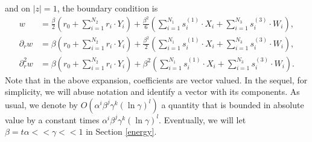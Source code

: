 \documentclass[11pt,letterpaper]{amsart}
\theoremstyle{definition}
\theoremstyle{remark}
\numberwithin{equation}{section}
\begin{document}
and on $|z|=1$, the boundary condition is
\begin{equation}
    \begin{split}
        w&=\frac{\beta}{2}\left(r_0+\sum_{i=1}^{N_2}r_i\cdot Y_i \right)+\frac{\beta^2}{6}\left(\sum_{i=1}^{N_1} s^{(1)}_i\cdot X_i+\sum_{i=1}^{N_3}s^{(3)}_i\cdot W_i \right),\\
        \partial_r w&=\beta \left(r_0+\sum_{i=1}^{N_2}r_i\cdot Y_i \right)+\frac{\beta^2}{2}\left(\sum_{i=1}^{N_1} s^{(1)}_i\cdot X_i+\sum_{i=1}^{N_3}s^{(3)}_i\cdot W_i \right),\\
        \partial^2_r w&=\beta \left(r_0+\sum_{i=1}^{N_2}r_i\cdot Y_i \right)+\beta^2 \left(\sum_{i=1}^{N_1} s^{(1)}_i\cdot X_i+\sum_{i=1}^{N_3}s^{(3)}_i\cdot W_i \right).
    \end{split}
\end{equation}
Note that in the above expansion, coefficients are vector valued. In the sequel, for simplicity, we will abuse notation and identify a vector with its components. As usual, we denote by $O(\alpha^i \beta^j\gamma^k (\ln \gamma)^l)$ a quantity that is bounded in absolute value by a constant times $\alpha^i \beta^j\gamma^k (\ln \gamma)^l$. Eventually, we will let $\beta=t\alpha<<\gamma<<1$ in Section \ref{energy}.
\end{document}
